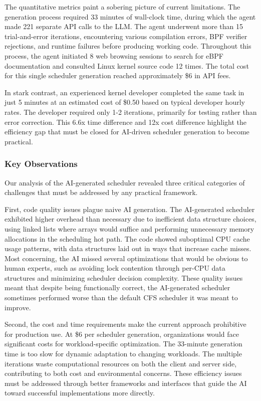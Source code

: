 The quantitative metrics paint a sobering picture of current limitations. The generation process required 33 minutes of wall-clock time, during which the agent made 221 separate API calls to the LLM. The agent underwent more than 15 trial-and-error iterations, encountering various compilation errors, BPF verifier rejections, and runtime failures before producing working code. Throughout this process, the agent initiated 8 web browsing sessions to search for eBPF documentation and consulted Linux kernel source code 12 times. The total cost for this single scheduler generation reached approximately \$6 in API fees.

In stark contrast, an experienced kernel developer completed the same task in just 5 minutes at an estimated cost of \$0.50 based on typical developer hourly rates. The developer required only 1-2 iterations, primarily for testing rather than error correction. This 6.6x time difference and 12x cost difference highlight the efficiency gap that must be closed for AI-driven scheduler generation to become practical.

\subsubsection{Key Observations}

Our analysis of the AI-generated scheduler revealed three critical categories of challenges that must be addressed by any practical framework.

First, code quality issues plague naive AI generation. The AI-generated scheduler exhibited higher overhead than necessary due to inefficient data structure choices, using linked lists where arrays would suffice and performing unnecessary memory allocations in the scheduling hot path. The code showed suboptimal CPU cache usage patterns, with data structures laid out in ways that increase cache misses. Most concerning, the AI missed several optimizations that would be obvious to human experts, such as avoiding lock contention through per-CPU data structures and minimizing scheduler decision complexity. These quality issues meant that despite being functionally correct, the AI-generated scheduler sometimes performed worse than the default CFS scheduler it was meant to improve.

Second, the cost and time requirements make the current approach prohibitive for production use. At \$6 per scheduler generation, organizations would face significant costs for workload-specific optimization. The 33-minute generation time is too slow for dynamic adaptation to changing workloads. The multiple iterations waste computational resources on both the client and server side, contributing to both cost and environmental concerns. These efficiency issues must be addressed through better frameworks and interfaces that guide the AI toward successful implementations more directly.


